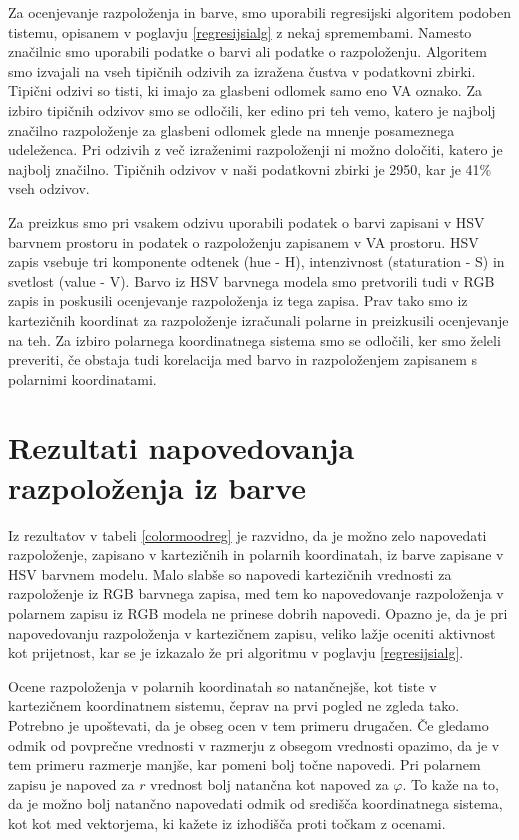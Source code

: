 \documentclass[a4paper, 12pt]{book}
\begin{document}
{Za ocenjevanje razpoloženja in barve, smo uporabili regresijski algoritem podoben tistemu, opisanem v poglavju \ref{regresijsialg} z nekaj spremembami. Namesto značilnic smo uporabili podatke o barvi ali podatke o razpoloženju. Algoritem smo izvajali na vseh tipičnih odzivih za izražena čustva v podatkovni zbirki. Tipični odzivi so tisti, ki imajo za glasbeni odlomek samo eno VA oznako. Za izbiro tipičnih odzivov smo se odločili, ker edino pri teh vemo, katero je najbolj značilno razpoloženje za glasbeni odlomek glede na mnenje posameznega udeleženca. Pri odzivih z več izraženimi razpoloženji ni možno določiti, katero je najbolj značilno. Tipičnih odzivov v naši podatkovni zbirki je 2950, kar je 41\% vseh odzivov. 

Za preizkus smo pri vsakem odzivu uporabili podatek o barvi zapisani v HSV barvnem prostoru in podatek o razpoloženju zapisanem v VA prostoru. HSV zapis \cite{Sural2002} vsebuje tri komponente odtenek (hue - H), intenzivnost (staturation - S) in svetlost (value - V). Barvo iz HSV barvnega modela smo pretvorili tudi v RGB zapis \cite{susstrunk1999standard} in poskusili ocenjevanje razpoloženja iz tega zapisa. Prav tako smo iz kartezičnih koordinat za razpoloženje izračunali polarne \cite{julier1997consistent} in preizkusili ocenjevanje na teh. Za izbiro polarnega koordinatnega sistema smo se odločili, ker smo želeli preveriti, če obstaja tudi korelacija med barvo in razpoloženjem zapisanem s polarnimi koordinatami. 

\section{Rezultati napovedovanja razpoloženja iz barve}

Iz rezultatov v tabeli \ref{colormoodreg} je razvidno, da je možno zelo napovedati razpoloženje, zapisano v kartezičnih in polarnih koordinatah, iz barve zapisane v HSV barvnem modelu. Malo slabše so napovedi kartezičnih vrednosti za razpoloženje iz RGB barvnega zapisa, med tem ko napovedovanje razpoloženja v polarnem zapisu iz RGB modela ne prinese dobrih napovedi. Opazno je, da je pri napovedovanju razpoloženja v kartezičnem zapisu, veliko lažje oceniti aktivnost kot prijetnost, kar se je izkazalo že pri algoritmu v poglavju \ref{regresijsialg}. 

Ocene razpoloženja v polarnih koordinatah so natančnejše, kot tiste v kartezičnem koordinatnem sistemu, čeprav na prvi pogled ne zgleda tako. Potrebno je upoštevati, da je obseg ocen v tem primeru drugačen. Če gledamo odmik od povprečne vrednosti v razmerju z obsegom vrednosti opazimo, da je v tem primeru razmerje manjše, kar pomeni bolj točne napovedi. Pri polarnem zapisu je napoved za $r$ vrednost bolj natančna kot napoved za $\varphi$. To kaže na to, da je možno bolj natančno napovedati odmik od središča koordinatnega sistema, kot kot med vektorjema, ki kažete iz izhodišča proti točkam z ocenami.

}
\end{document}
